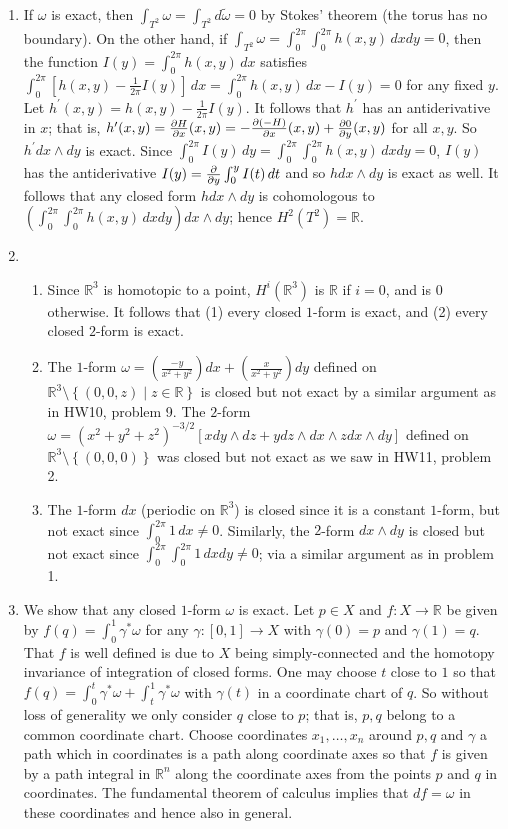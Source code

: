 \documentclass[11pt,leqno]{article}
\theoremstyle{plain}
\theoremstyle{definition}
\numberwithin{equation}{section}
\numberwithin{lem}{section}
\newcommand{\cbr}[1]{\left\{#1\right\}}
\begin{document}
\begin{enumerate}
    \item If $\omega$ is exact, then $\int_{T^2}\omega = \int_{T^2} d\tilde \omega = 0$ by Stokes' theorem (the torus has no boundary). On the other hand, if $\int_{T^2}\omega = \int_0^{2\pi}\int_0^{2\pi}h(x,y)\,dxdy = 0$, then the function $I(y) = \int_0^{2\pi}h(x,y)\,dx$ satisfies $\int_0^{2\pi}[h(x,y)-\frac{1}{2\pi}I(y)]\,dx = \int_0^{2\pi}h(x,y)\,dx-I(y) = 0$ for any fixed $y$. Let $h^\prime(x,y) = h(x,y) - \frac{1}{2\pi}I(y)$. It follows that $h^\prime$ has an antiderivative in $x$; that is, $h^\prime(x,y) = \pdv{H}{x}\/(x,y) = -\pdv{(-H)}{x}\/(x,y) + \pdv{0}{y}\/(x,y)$ for all $x,y$. So $h^\prime dx\wedge dy$ is exact. Since $\int_0^{2\pi}I(y)\,dy = \int_0^{2\pi}\int_0^{2\pi}h(x,y)\,dx dy = 0$, $I(y)$ has the antiderivative $I(y) = \pdv{y}\int_0^yI(t)\,dt$ and so $hdx\wedge dy$ is exact as well. It follows that any closed form $hdx\wedge dy$ is cohomologous to $(\int_0^{2\pi}\int_0^{2\pi}h(x,y)\,dx dy)dx\wedge dy$; hence $H^2(T^2) = \mathbb R$.
    \item \begin{enumerate}
      \item Since $\mathbb R^3$ is homotopic to a point, $H^i(\mathbb R^3)$ is $\mathbb R$ if $i = 0$, and is $0$ otherwise. It follows that (1) every closed $1$-form is exact, and (2) every closed $2$-form is exact.
      \item The $1$-form $\omega = (\frac{-y}{x^2 + y^2}) dx + (\frac{x}{x^2 + y^2} ) dy$ defined on $\mathbb R^3\setminus \cbr{(0,0,z)\mid z\in\mathbb R}$ is closed but not exact by a similar argument as in HW10, problem 9. The $2$-form $\omega = (x^2+y^2+z^2)^{-3/2}[xdy\wedge dz + ydz\wedge dx\wedge zdx\wedge dy]$ defined on $\mathbb R^3\setminus \cbr{(0,0,0)}$ was closed but not exact as we saw in HW11, problem 2.
      \item The $1$-form $dx$ (periodic on $\mathbb R^3$) is closed since it is a constant $1$-form, but not exact since $\int_0^{2\pi}1\,dx \neq 0$. Similarly, the $2$-form $dx\wedge dy$ is closed but not exact since $\int_0^{2\pi}\int_0^{2\pi}1\,dxdy \neq 0$; via a similar argument as in problem 1.
    \end{enumerate}
    \item We show that any closed $1$-form $\omega$ is exact. Let $p\in X$ and $f\colon X\to\mathbb R$ be given by $f(q) = \int_0^1 \gamma^\ast\omega$ for any $\gamma\colon [0,1]\to X$ with $\gamma(0) = p$ and $\gamma(1) = q$. That $f$ is well defined is due to $X$ being simply-connected and the homotopy invariance of integration of closed forms. One may choose $t$ close to $1$ so that $f(q) = \int_0^t\gamma^\ast\omega + \int_t^1\gamma^\ast \omega$ with $\gamma(t)$ in a coordinate chart of $q$. So without loss of generality we only consider $q$ close to $p$; that is, $p,q$ belong to a common coordinate chart. Choose coordinates $x_1,\dots,x_n$ around $p,q$ and $\gamma$ a path which in coordinates is a path along coordinate axes so that $f$ is given by a path integral in $\mathbb R^n$ along the coordinate axes from the points $p$ and $q$ in coordinates. The fundamental theorem of calculus implies that $df = \omega$ in these coordinates and hence also in general.

\end{enumerate}
\end{document}
